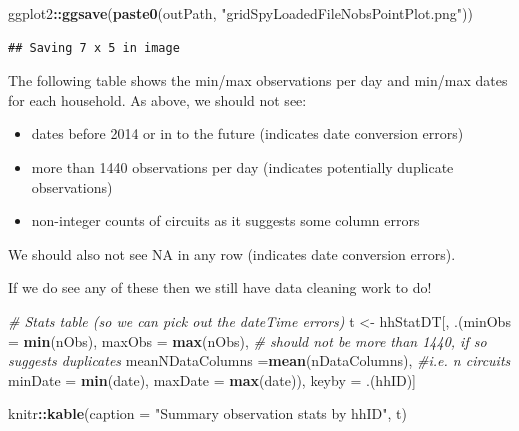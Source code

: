 \documentclass[]{article}
\newenvironment{Shaded}{\begin{snugshade}}{\end{snugshade}}
\newcommand{\KeywordTok}[1]{\textcolor[rgb]{0.13,0.29,0.53}{\textbf{#1}}}
\newcommand{\DataTypeTok}[1]{\textcolor[rgb]{0.13,0.29,0.53}{#1}}
\newcommand{\StringTok}[1]{\textcolor[rgb]{0.31,0.60,0.02}{#1}}
\newcommand{\CommentTok}[1]{\textcolor[rgb]{0.56,0.35,0.01}{\textit{#1}}}
\newcommand{\OperatorTok}[1]{\textcolor[rgb]{0.81,0.36,0.00}{\textbf{#1}}}
\newcommand{\NormalTok}[1]{#1}
\providecommand{\tightlist}{%
  \setlength{\itemsep}{0pt}\setlength{\parskip}{0pt}}
\begin{document}
\begin{Shaded}
\begin{Highlighting}[]
\NormalTok{ggplot2}\OperatorTok{::}\KeywordTok{ggsave}\NormalTok{(}\KeywordTok{paste0}\NormalTok{(outPath, }\StringTok{"gridSpyLoadedFileNobsPointPlot.png"}\NormalTok{))}
\end{Highlighting}
\end{Shaded}

\begin{verbatim}
## Saving 7 x 5 in image
\end{verbatim}

The following table shows the min/max observations per day and min/max
dates for each household. As above, we should not see:

\begin{itemize}
\tightlist
\item
  dates before 2014 or in to the future (indicates date conversion
  errors)
\item
  more than 1440 observations per day (indicates potentially duplicate
  observations)
\item
  non-integer counts of circuits as it suggests some column errors
\end{itemize}

We should also not see NA in any row (indicates date conversion errors).

If we do see any of these then we still have data cleaning work to do!

\begin{Shaded}
\begin{Highlighting}[]
\CommentTok{# Stats table (so we can pick out the dateTime errors)}
\NormalTok{t <-}\StringTok{ }\NormalTok{hhStatDT[, .(}\DataTypeTok{minObs =} \KeywordTok{min}\NormalTok{(nObs),}
             \DataTypeTok{maxObs =} \KeywordTok{max}\NormalTok{(nObs), }\CommentTok{# should not be more than 1440, if so suggests duplicates}
             \DataTypeTok{meanNDataColumns =}\KeywordTok{mean}\NormalTok{(nDataColumns), }\CommentTok{#i.e. n circuits}
             \DataTypeTok{minDate =} \KeywordTok{min}\NormalTok{(date),}
             \DataTypeTok{maxDate =} \KeywordTok{max}\NormalTok{(date)),}
\NormalTok{         keyby =}\StringTok{ }\NormalTok{.(hhID)]}

\NormalTok{knitr}\OperatorTok{::}\KeywordTok{kable}\NormalTok{(}\DataTypeTok{caption =} \StringTok{"Summary observation stats by hhID"}\NormalTok{, t)}
\end{Highlighting}
\end{Shaded}
\end{document}
